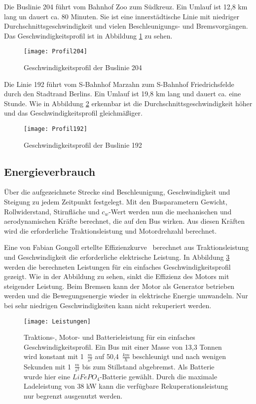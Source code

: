 Die Buslinie 204 führt vom Bahnhof Zoo zum Südkreuz. Ein Umlauf ist 12,8 km lang un dauert ca. 80 Minuten. Sie ist eine innerstädtische Linie mit niedriger Durchschnittsgeschwindigkeit und vielen Beschleunigungs- und Bremsvorgängen. Das Geschwindigkeitsprofil ist in Abbildung \ref{Abb_204} zu sehen.
\begin{figure}\centering
	\texttt{[image: Profil204]}
	\caption{Geschwindigkeitsprofil der Buslinie 204}
	\label{Abb_204}
\end{figure}

Die Linie 192 führt vom S-Bahnhof Marzahn zum S-Bahnhof Friedrichsfelde durch den Stadtrand Berlins. Ein Umlauf ist 19,8 km lang und dauert ca. eine Stunde. Wie in Abbildung \ref{Abb_192} erkennbar ist die Durchschnittsgeschwindigkeit höher und das Geschwindigkeitsprofil gleichmäßiger.

\begin{figure}\centering
	\texttt{[image: Profil192]}
	\caption{Geschwindigkeitsprofil der Buslinie 192}
	\label{Abb_192}
\end{figure}

\subsection{Energieverbrauch}
Über die aufgezeichnete Strecke sind Beschleunigung, Geschwindigkeit und Steigung zu jedem Zeitpunkt festgelegt. Mit den Busparametern Gewicht, Rollwiderstand, Stirnfläche und $c_w$-Wert werden nun die mechanischen und aerodynamischen Kräfte berechnet, die auf den Bus wirken. Aus diesen Kräften wird die erforderliche Traktionsleistung und Motordrehzahl berechnet.

Eine von Fabian Gongoll ertellte Effizienzkurve~\cite{MotorEntwurf} berechnet aus Traktionsleistung und Geschwindigkeit die erforderliche elektrische Leistung. In Abbildung \ref{abb_Leistungen} werden die berechneten Leistungen für ein einfaches Geschwindigkeitsprofil gezeigt. Wie in der Abbildung zu sehen, sinkt die Effizienz des Motors mit steigender Leistung. Beim Bremsen kann der Motor als Generator betrieben werden und die Bewegungsenergie wieder in elektrische Energie umwandeln. Nur bei sehr niedrigen Geschwindigkeiten kann nicht rekuperiert werden.
\begin{figure}\centering
	\texttt{[image: Leistungen]}
	\caption[Traktions-, Motor- und Batterieleistung]{Traktions-, Motor- und Batterieleistung für ein einfaches Geschwindigkeitsprofil. Ein Bus mit einer Masse von 13,3 Tonnen wird konstant mit 1~$\frac{m}{s^2}$ auf 50,4~$\frac{km}{h}$ beschleunigt und nach wenigen Sekunden mit 1~$\frac{m}{s^2}$ bis zum Stillstand abgebremst. Als Batterie wurde hier eine $LiFePO_4$-Batterie gewählt. Durch die maximale Ladeleistung von 38 kW kann die verfügbare Rekuperationsleistung nur begrenzt ausgenutzt werden.}
	\label{abb_Leistungen}
\end{figure}

